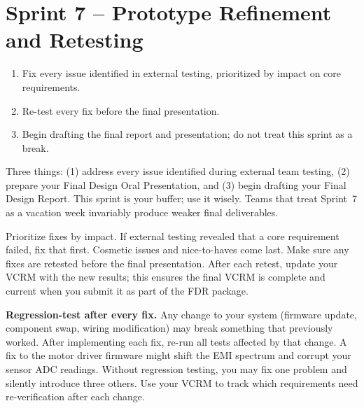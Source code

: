 \section{Sprint 7 -- Prototype Refinement and Retesting}

\begin{priorities}
\begin{enumerate}[leftmargin=*, itemsep=1pt, topsep=0pt]
    \item Fix every issue identified in external testing, prioritized by impact on core requirements.
    \item Re-test every fix before the final presentation.
    \item Begin drafting the final report and presentation; do not treat this sprint as a break.
\end{enumerate}
\end{priorities}

\begin{faqbox}
Three things: (1) address every issue identified during external team testing, (2) prepare your Final Design Oral Presentation, and (3) begin drafting your Final Design Report. This sprint is your buffer; use it wisely. Teams that treat Sprint~7 as a vacation week invariably produce weaker final deliverables.
\end{faqbox}

\begin{tipbox}
Prioritize fixes by impact. If external testing revealed that a core requirement failed, fix that first. Cosmetic issues and nice-to-haves come last. Make sure any fixes are retested before the final presentation. After each retest, update your VCRM with the new results; this ensures the final VCRM is complete and current when you submit it as part of the FDR package.
\end{tipbox}

\begin{warnbox}
\textbf{Regression-test after every fix.} Any change to your system (firmware update, component swap, wiring modification) may break something that previously worked. After implementing each fix, re-run all tests affected by that change. A fix to the motor driver firmware might shift the EMI spectrum and corrupt your sensor ADC readings. Without regression testing, you may fix one problem and silently introduce three others. Use your VCRM to track which requirements need re-verification after each change.
\end{warnbox}

